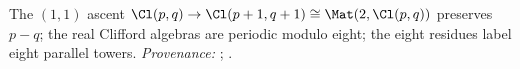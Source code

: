 The $(1,1)$ ascent $\Cl(p,q) \to \Cl(p+1,q+1) \cong \Mat(2, \Cl(p,q))$ preserves $p - q$; the real Clifford algebras are periodic modulo eight; the eight residues label eight parallel towers. \emph{Provenance:} \cite[Thms.~3.2 and 3.6]{ButlerT3}; \cite[Fact~2.5]{ButlerT14}.
